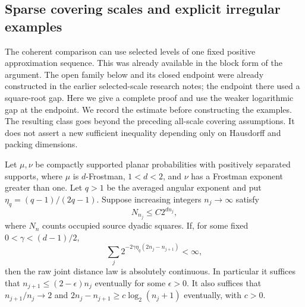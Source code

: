 \subsection{Sparse covering scales and explicit irregular examples}
\label{sparsemoran:section}

The coherent comparison can use selected levels of one fixed positive
approximation sequence. This was already available in the block form of
the argument. The open family below and its closed endpoint were already
constructed in the earlier selected-scale research notes; the endpoint
there used a square-root gap. Here we give a complete proof and use the
weaker logarithmic gap at the endpoint. We record the estimate before
constructing the examples. The
resulting class goes beyond the preceding all-scale covering assumptions.
It does not assert a new sufficient inequality depending only on
Hausdorff and packing dimensions.

\begin{proposition}
\label{sparsemoran:criterion}
Let \(\mu,\nu\) be compactly supported planar probabilities with
positively separated supports, where \(\mu\) is \(d\)-Frostman,
\(1<d<2\), and \(\nu\) has a Frostman exponent greater than one.
Let \(q>1\) be the averaged angular exponent and put
\(\eta_q=(q-1)/(2q-1)\). Suppose increasing integers \(n_j\to\infty\)
satisfy
\begin{equation}\label{sparsemoran:selectedcount}
 N_{n_j}\le C2^{dn_j},
\end{equation}
where \(N_n\) counts occupied source dyadic squares.
If, for some fixed \(0<\gamma<(d-1)/2\),
\begin{equation}\label{sparsemoran:series}
 \sum_j2^{-2\gamma\eta_q(2n_j-n_{j+1})}<\infty,
\end{equation}
then the raw joint distance law is absolutely continuous.
In particular it suffices that
\(n_{j+1}\le(2-\epsilon)n_j\) eventually for some \(\epsilon>0\).
It also suffices that \(n_{j+1}/n_j\to2\) and
\(2n_j-n_{j+1}\ge c\log_2(n_j+1)\) eventually, with \(c>0\).
\end{proposition}

